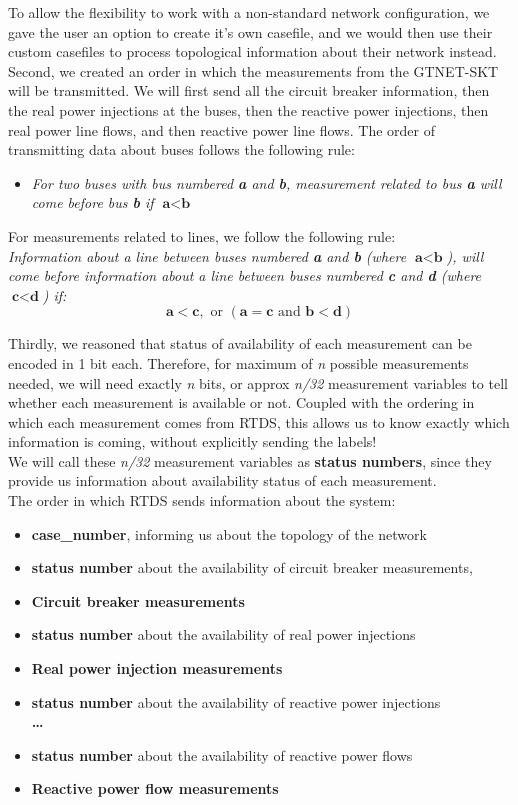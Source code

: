 To allow the flexibility to work with a non-standard network configuration, we gave the user an option to create it's own casefile, and we would then use their custom casefiles to process topological information about their network instead. 
\\Second, we created an order in which the measurements from the GTNET-SKT will be transmitted. We will first send all the circuit breaker information, then the real power injections at the buses, then the reactive power injections, then real power line flows, and then reactive power line flows. The order of transmitting data about buses follows the following rule:
\begin{itemize}
\item \emph{For two buses with bus numbered \textbf{a} and \textbf{b}, measurement related to bus \textbf{a} will come before bus \textbf{b} if $\textbf{a}<\textbf{b}$}
\end{itemize}
For measurements related to lines, we follow the following rule:\\
\emph{Information about a line between buses numbered \textbf{a} and \textbf{b} (where $\textbf{a}<\textbf{b}$), will come before information about a line between buses numbered \textbf{c} and \textbf{d} (where $\textbf{c}<\textbf{d}$) if: $$\textbf{a} < \textbf{c}, \textrm{ or } (\textbf{a}=\textbf{c} \textrm{ and }  \textbf{b}<\textbf{d})$$}

Thirdly, we reasoned that status of availability of each measurement can be encoded in 1 bit each. Therefore, for maximum of \emph{n} possible measurements needed, we will need exactly \emph{n} bits, or approx \emph{n/32} measurement variables to tell whether each measurement is available or not. Coupled with the ordering in which each measurement comes from RTDS, this allows us to know exactly which information is coming, without explicitly sending the labels!\\
We will call these \emph{n/32} measurement variables as \textbf{status numbers}, since they provide us information about availability status of each measurement. \\
The order in which RTDS sends information about the system:
\begin{itemize}
\item \textbf{case\_number}, informing us about the topology of the network
\item \textbf{status number} about the availability of circuit breaker measurements,
\item \textbf{Circuit breaker measurements} 
\item \textbf{status number} about the availability of real power injections
\item \textbf{Real power injection measurements} 
\item \textbf{status number} about the availability of reactive power injections
\\ \textbf{\dots}
\item \textbf{status number} about the availability of reactive power flows
\item \textbf{Reactive power flow measurements} 
\end{itemize}

